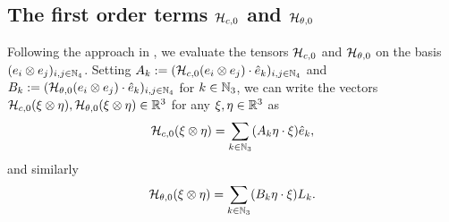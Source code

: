 


\subsection{The first order terms $\mathcal{H}_{c,0}$ and $\mathcal{H}_{\theta,0}$}
Following the approach in \cite{Alouges2017}, we evaluate the tensors $\mathcal{H}_{c,0}$ and $\mathcal{H}_{\theta,0}$ on the basis $(e_{i} \otimes e_{j})_{i,j \in \mathbb{N}_4}$. Setting $A_k := (\mathcal{H}_{c,0}(e_i \otimes e_j)\cdot \hat{e}_k)_{i,j \in \mathbb{N}_4}$ and $B_k:= (\mathcal{H}_{\theta,0}(e_i \otimes e_j)\cdot \hat{e}_k)_{i,j \in \mathbb{N}_4}$ for $k \in \mathbb{N}_3$, we can write the vectors $\mathcal{H}_{c,0}(\xi \otimes \eta), \mathcal{H}_{\theta,0}(\xi \otimes \eta) \in \mathbb{R}^3$ for any $\xi, \eta \in \mathbb{R}^3$ as
\begin{equation}
\label{eq: matrix representation of spatial first order term}
	\mathcal{H}_{c,0}(\xi \otimes \eta) = \sum_{k \in \mathbb{N}_3}(A_k \eta \cdot \xi)\hat{e}_k, 
\end{equation}
and similarly
\begin{equation}
\label{eq: matrix representation of angular first order term}
	\mathcal{H}_{\theta, 0}(\xi \otimes \eta) = \sum_{k \in \mathbb{N}_3}(B_k \eta \cdot \xi) L_k.
\end{equation}


